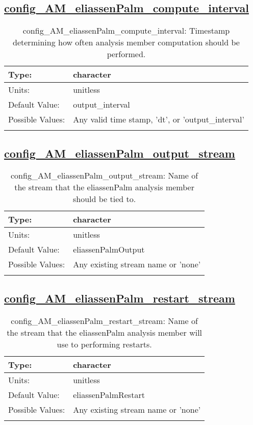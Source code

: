 \subsection[config\_AM\_eliassenPalm\_compute\_interval]{\hyperref[sec:nm_tab_AM_eliassenPalm]{config\_AM\_eliassenPalm\_compute\_interval}}
\label{subsec:nm_sec_config_AM_eliassenPalm_compute_interval}
\begin{center}
\begin{longtable}{| p{2.0in} || p{4.0in} |}
    \hline
    Type: & character \\
    \hline
    Units: & \si{unitless} \\
    \hline
    Default Value: & output\_interval \\
    \hline
    Possible Values: & Any valid time stamp, 'dt', or 'output\_interval' \\
    \hline
    \caption{config\_AM\_eliassenPalm\_compute\_interval: Timestamp determining how often analysis member computation should be performed.}
\end{longtable}
\end{center}
\subsection[config\_AM\_eliassenPalm\_output\_stream]{\hyperref[sec:nm_tab_AM_eliassenPalm]{config\_AM\_eliassenPalm\_output\_stream}}
\label{subsec:nm_sec_config_AM_eliassenPalm_output_stream}
\begin{center}
\begin{longtable}{| p{2.0in} || p{4.0in} |}
    \hline
    Type: & character \\
    \hline
    Units: & \si{unitless} \\
    \hline
    Default Value: & eliassenPalmOutput \\
    \hline
    Possible Values: & Any existing stream name or 'none' \\
    \hline
    \caption{config\_AM\_eliassenPalm\_output\_stream: Name of the stream that the eliassenPalm analysis member should be tied to.}
\end{longtable}
\end{center}
\subsection[config\_AM\_eliassenPalm\_restart\_stream]{\hyperref[sec:nm_tab_AM_eliassenPalm]{config\_AM\_eliassenPalm\_restart\_stream}}
\label{subsec:nm_sec_config_AM_eliassenPalm_restart_stream}
\begin{center}
\begin{longtable}{| p{2.0in} || p{4.0in} |}
    \hline
    Type: & character \\
    \hline
    Units: & \si{unitless} \\
    \hline
    Default Value: & eliassenPalmRestart \\
    \hline
    Possible Values: & Any existing stream name or 'none' \\
    \hline
    \caption{config\_AM\_eliassenPalm\_restart\_stream: Name of the stream that the eliassenPalm analysis member will use to performing restarts.}
\end{longtable}
\end{center}
